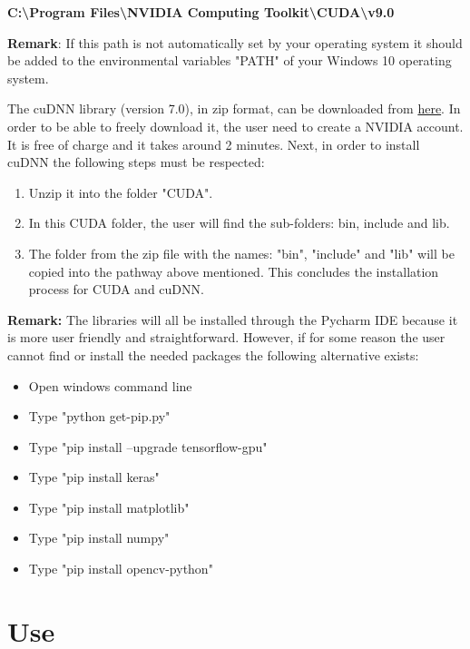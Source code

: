 \documentclass[12pt,a4paper,twoside]{report}
\begin{document}
\textbf{C:\textbackslash Program Files\textbackslash NVIDIA Computing Toolkit\textbackslash CUDA\textbackslash v9.0} \newline

\textbf{Remark}: If this path is not automatically set by your operating system it should be added to the environmental variables "PATH" of your Windows 10 operating system.

The cuDNN library (version 7.0), in zip format, can be downloaded from \href{https://developer.nvidia.com/cudnn}{here}. In order to be able to freely download it, the user need to create a NVIDIA account. It is free of charge and it takes around 2 minutes. Next, in order to install cuDNN the following steps must be respected:
\begin{enumerate}
    \item Unzip it into the folder "CUDA".
    \item In this CUDA folder, the user will find the sub-folders: bin, include and lib.
    \item The folder from the zip file with the names: "bin", "include" and "lib" will be copied into the pathway above mentioned. This concludes the installation process for CUDA and cuDNN.
\end{enumerate}

\textbf{Remark:} The libraries will all be installed through the Pycharm IDE because it is more user friendly and straightforward. However, if for some reason the user cannot find or install the needed packages the following alternative exists:\newline
\begin{itemize}
    \item Open windows command line
    \item Type "python get-pip.py"
    \item Type "pip install --upgrade tensorflow-gpu" 
    \item Type "pip install keras"
    \item Type "pip install matplotlib"
    \item Type "pip install numpy"
    \item Type "pip install opencv-python"
\end{itemize}

\section{Use}
\end{document}

